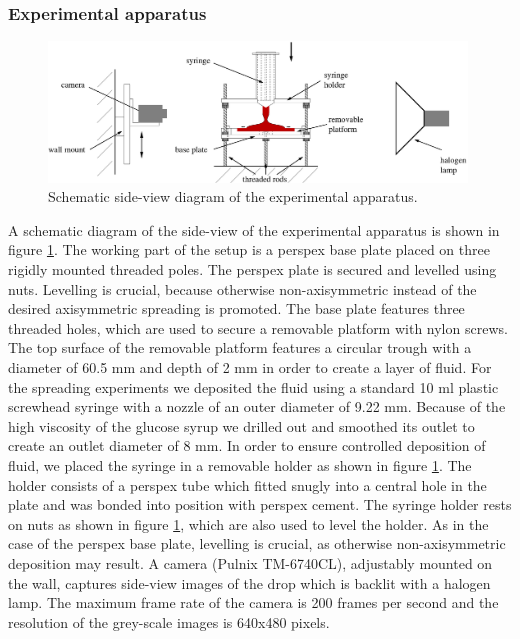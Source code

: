 \documentclass[aip,graphicx]{revtex4-1}
\begin{document}
\subsubsection{Experimental apparatus}

\begin{figure}[!h]
\centering
\includegraphics[width=0.99\textwidth]{figures/experimental_apparatus.eps}
\caption{Schematic side-view diagram of the experimental apparatus.}
\label{fig:experimental_apparatus}
\end{figure}

A schematic diagram of the side-view of the experimental apparatus is shown in figure \ref{fig:experimental_apparatus}.
The working part of the setup is a perspex base plate placed on three rigidly mounted threaded poles.
The perspex plate is secured and levelled using nuts.
Levelling is crucial, because otherwise non-axisymmetric instead of the desired axisymmetric spreading is promoted. 
The base plate features three threaded holes, which are used to secure a removable platform with nylon screws.
The top surface of the removable platform features a circular trough with a diameter of 60.5 mm and depth of 2 mm in order to create a layer of fluid.
For the spreading experiments we deposited the fluid using a standard 10 ml plastic screwhead syringe with a nozzle of an outer diameter of 9.22 mm. 
Because of the high viscosity of the glucose syrup we drilled out and smoothed its outlet to create an outlet diameter of 8 mm. 
In order to ensure controlled deposition of fluid, we placed the syringe in a removable holder as shown in figure \ref{fig:experimental_apparatus}. 
The holder consists of a perspex tube which fitted snugly into a central hole in the plate and was bonded into position with perspex cement. 
The syringe holder rests on nuts as shown in figure \ref{fig:experimental_apparatus}, which are also used to level the holder. 
As in the case of the perspex base plate, levelling is crucial, as otherwise non-axisymmetric deposition may result.
A camera (Pulnix TM-6740CL), adjustably mounted on the wall, captures side-view images of the drop which is backlit with a halogen lamp.
The maximum frame rate of the camera is 200 frames per second and the resolution of the grey-scale images is 640x480 pixels.
\end{document}
